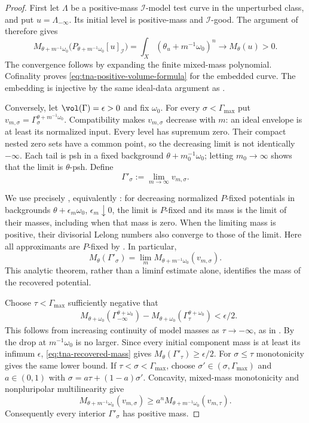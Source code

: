 \begin{proof}
First let $\Lambda$ be a positive-mass $\mathcal I$-model test curve
in the unperturbed class, and put $u=\Lambda_{-\infty}$.
Its initial level is positive-mass and $\mathcal I$-good.
The argument of  therefore gives
\[
 M_{\theta+m^{-1}\omega_0}
   \bigl(P_{\theta+m^{-1}\omega_0}[u]_{\mathcal I}\bigr)
 =\int_X(\theta_u+m^{-1}\omega_0)^n
 \longrightarrow M_\theta(u)>0.
\]
The convergence follows by expanding the finite mixed-mass polynomial.
Cofinality proves \eqref{eq:tna-positive-volume-formula} for the embedded
curve.  The embedding is injective by the same ideal-data argument as
.

Conversely, let $\vol(\Gamma)=\epsilon>0$ and fix $\omega_0$.
For every $\sigma<\Gamma_{\max}$ put
$v_{m,\sigma}=\Gamma_\sigma^{\theta+m^{-1}\omega_0}$.
Compatibility makes $v_{m,\sigma}$ decrease with $m$: an ideal envelope
is at least its normalized input.  Every level has supremum zero.
Their compact nested zero sets have a common point, so the decreasing
limit is not identically $-\infty$.  Each tail is psh in a fixed
background $\theta+m_0^{-1}\omega_0$; letting $m_0\to\infty$ shows
that the limit is $\theta$-psh.  Define
\[
 \Gamma'_\sigma:=\lim_{m\to\infty}v_{m,\sigma}.
\tag{53.18}\label{eq:tna-positive-recovery}
\]

We use precisely \cite[Proposition~3.1.12]{XiaBook}, equivalently
\cite[Lemma~2.10]{XiaOperationsV3}: for decreasing normalized
$P$-fixed potentials in backgrounds $\theta+\epsilon_m\omega_0$,
$\epsilon_m\downarrow0$, the limit is $P$-fixed and its mass is the
limit of their masses, including when that mass is zero.
When the limiting mass is positive, their divisorial Lelong numbers
also converge to those of the limit.  Here all approximants are
$P$-fixed by .  In particular,
\[
 M_\theta(\Gamma'_\sigma)
 =\lim_m M_{\theta+m^{-1}\omega_0}(v_{m,\sigma}).
\tag{53.18a}\label{eq:tna-recovered-mass}
\]
This analytic theorem, rather than a liminf estimate alone, identifies
the mass of the recovered potential.

Choose $\tau<\Gamma_{\max}$ sufficiently negative that
\[
 \begin{split}
 &M_{\theta+\omega_0}(\Gamma_{-\infty}^{\theta+\omega_0})
 -M_{\theta+\omega_0}(\Gamma_\tau^{\theta+\omega_0})
 <\epsilon/2.
 \end{split}
\tag{53.19}\label{eq:tna-mass-drop-choice}
\]
This follows from increasing continuity of model masses as
$\tau\to-\infty$, as in .
By  the drop at $m^{-1}\omega_0$
is no larger.  Since every initial component mass is at least its
infimum $\epsilon$, \eqref{eq:tna-recovered-mass} gives
$M_\theta(\Gamma'_\tau)\geq\epsilon/2$.
For $\sigma\leq\tau$ monotonicity gives the same lower bound.
If $\tau<\sigma<\Gamma_{\max}$, choose
$\sigma'\in(\sigma,\Gamma_{\max})$ and $a\in(0,1)$ with
$\sigma=a\tau+(1-a)\sigma'$.
Concavity, mixed-mass monotonicity and nonpluripolar multilinearity give
\[
 M_{\theta+m^{-1}\omega_0}(v_{m,\sigma})
 \geq a^nM_{\theta+m^{-1}\omega_0}(v_{m,\tau}).
\]
Consequently every interior $\Gamma'_\sigma$ has positive mass.


\end{proof}
